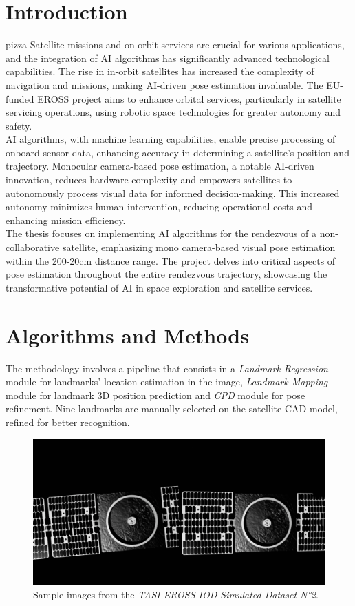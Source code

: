 \documentclass[conference]{IEEEtran}
\begin{document}
\section{Introduction}
pizza
Satellite missions and on-orbit services are crucial for various applications, and the integration of AI algorithms has significantly advanced technological capabilities. The rise in in-orbit satellites has increased the complexity of navigation and missions, making AI-driven pose estimation invaluable. The EU-funded EROSS project aims to enhance orbital services, particularly in satellite servicing operations, using robotic space technologies for greater autonomy and safety.\\
AI algorithms, with machine learning capabilities, enable precise processing of onboard sensor data, enhancing accuracy in determining a satellite's position and trajectory. Monocular camera-based pose estimation, a notable AI-driven innovation, reduces hardware complexity and empowers satellites to autonomously process visual data for informed decision-making. This increased autonomy minimizes human intervention, reducing operational costs and enhancing mission efficiency.\\
The thesis focuses on implementing AI algorithms for the rendezvous of a non-collaborative satellite, emphasizing mono camera-based visual pose estimation within the 200-20cm distance range. The project delves into critical aspects of pose estimation throughout the entire rendezvous trajectory, showcasing the transformative potential of AI in space exploration and satellite services.
\section{Algorithms and Methods}
The methodology involves a pipeline that consists in a \textit{Landmark Regression} module for landmarks' location estimation in the image, \textit{Landmark Mapping} module for  landmark 3D position prediction and \textit{CPD} module for pose refinement.
Nine landmarks are manually selected on the satellite CAD model, refined for better recognition.

\begin{figure}[htbp]
\centerline{\includegraphics[scale=0.32]{DatabaseExample.png}}
\caption{Sample images from the \textit{TASI EROSS IOD Simulated Dataset N°2}.}
\label{fig}
\end{figure}
\end{document}
